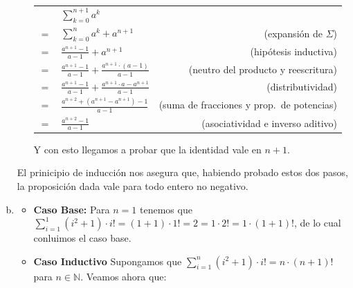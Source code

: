 \begin{enumerate}[(a)]
\begin{itemize}
              \begin{tabular}{|l l r}
                 & $\sum_{k=0}^{n+1} a^k$ & \\
                $=$ & $\sum_{k=0}^{n} a^k + a^{n+1}$ & (expansión de $\Sigma$) \\
                $=$ & $\frac{a^{n+1} - 1}{a - 1} + a^{n+1}$ & (hipótesis inductiva) \\
                $=$ & $\frac{a^{n+1} - 1}{a - 1} + \frac{a^{n+1} \cdot (a-1)}{a-1}$ & (neutro del producto y reescritura) \\
                $=$ & $\frac{a^{n+1} - 1}{a - 1} + \frac{a^{n+1} \cdot a - a^{n+1}}{a - 1}$ & (distributividad) \\
                $=$ & $\frac{a^{n+2} + (a^{n+1} - a^{n+1}) - 1}{a - 1}$ & (suma de fracciones y prop.\ de potencias) \\
                $=$ & $\frac{a^{n+2} - 1}{a - 1}$ & (asociatividad e inverso aditivo) \\
              \end{tabular}

              Y con esto llegamos a probar que la identidad vale en $n+1$.
    \end{itemize}

        El prinicipio de inducción nos asegura que, habiendo probado estos dos pasos, la proposición dada vale para todo entero no negativo.

    \item \begin{itemize}
        \item \textbf{Caso Base:} Para $n=1$ tenemos que $\sum_{i=1}^{1} (i^2 + 1) \cdot i! = (1 + 1) \cdot 1! = 2 = 1 \cdot 2! = 1 \cdot (1 + 1)!$, de lo cual conluimos el caso base.
        \item \textbf{Caso Inductivo} Supongamos que $\sum_{i=1}^{n} (i^2 + 1) \cdot i! = n \cdot (n+1)!$ para $n \in \mathbb{N}$.
              Veamos ahora que:


\end{itemize}
\end{enumerate}
